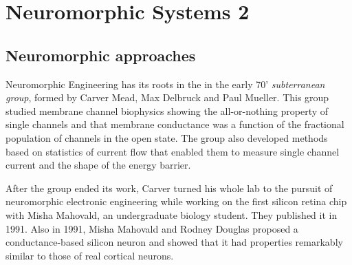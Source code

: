\documentclass[main]{subfiles}
\begin{document}
\newpage
\section{Neuromorphic Systems 2} \label{l12}

\subsection{Neuromorphic approaches}
Neuromorphic Engineering has its roots in the in the early 70' \textit{subterranean group}, formed by Carver Mead, Max Delbruck and Paul Mueller. This group studied membrane channel biophysics showing the all-or-nothing property of single channels and that membrane conductance was a function of the fractional population of channels in the open state. The group also developed methods based on statistics of current flow that enabled them to measure single channel current and the shape of the energy barrier.

After the group ended its work, Carver turned his whole lab to the pursuit of neuromorphic electronic engineering while working on the first silicon retina chip with Misha Mahovald, an undergraduate biology student. They published it in 1991.
Also in 1991, Misha Mahovald and Rodney Douglas proposed a conductance-based silicon neuron and showed that it had properties remarkably similar to those of real cortical neurons.
\end{document}

